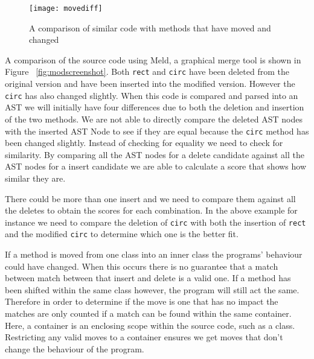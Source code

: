 \begin{figure}[!t]
\begin{center}
 \texttt{[image: movediff]}
 \end{center}
\caption{A comparison of similar code with methods that have moved and changed}
 \label{fig:orig}
\end{figure}


A comparison of the source code using Meld, a graphical merge tool is shown in Figure ~\ref{fig:modscreenshot}.
Both \lstinline{rect} and \lstinline{circ} have been deleted from the original version and have been inserted into the modified version.  
However the \lstinline{circ} has also changed slightly. 
When this code is compared and parsed into an AST we will initially have four differences due to both the deletion and insertion of the two methods.    
We are not able to directly compare the deleted AST nodes with the inserted AST Node to see if they are equal because the \lstinline{circ} method has been changed slightly. 
Instead of checking for equality we need to check for similarity.
By comparing all the AST nodes for a delete candidate against all the AST nodes for a insert candidate we are able to calculate a score that shows how similar they are.

There could be more than one insert and we need to compare them against all the deletes to obtain the scores for each combination.
In the above example for instance we need to compare the deletion of \lstinline{circ} with both the insertion of \lstinline{rect} and the modified \lstinline{circ} to determine which one is the better fit.

If a method is moved from one class into an inner class the programs' behaviour could have changed. 
When this occurs there is no guarantee that a match between match between that insert and delete is a valid one.
If a method has been shifted within the same class however, the program will still act the same.  
Therefore in order to determine if the move is one that has no impact the matches are only counted if a match can be found within the same container.  
Here, a container is an enclosing scope within the source code, such as a class. 
Restricting any valid moves to a container ensures we get moves that don't change the behaviour of the program.

